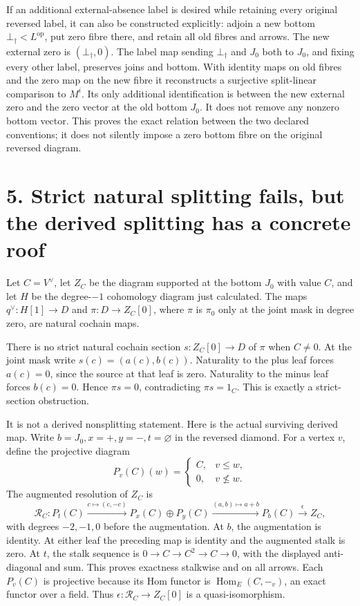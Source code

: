 \documentclass[10pt,a4paper,oneside]{report}
\begin{document}
If an additional external-absence label is desired while retaining every
original reversed label, it can also be constructed explicitly: adjoin a
new bottom \(\bot_\dagger<L^{\mathrm{op}}\), put zero fibre there, and
retain all old fibres and arrows. The new external zero is
\((\bot_\dagger,0)\). The label map sending \(\bot_\dagger\) and \(J_0\)
both to \(J_0\), and fixing every other label, preserves joins and
bottom. With identity maps on old fibres and the zero map on the new
fibre it reconstructs a surjective split-linear comparison to \(M^i\).
Its only additional identification is between the new external zero and
the zero vector at the old bottom \(J_0\). It does not remove any
nonzero bottom vector. This proves the exact relation between the two
declared conventions; it does not silently impose a zero bottom fibre on
the original reversed diagram.

\section{5. Strict natural splitting fails, but the derived splitting
has a concrete
roof}\label{proof03:strict-natural-splitting-fails-but-the-derived-splitting-has-a-concrete-roof}

Let \(C=V^\vee\), let \(Z_C\) be the diagram supported at the bottom
\(J_0\) with value \(C\), and let \(H\) be the degree-\(-1\) cohomology
diagram just calculated. The maps \(q^\vee:H[1]\to D\) and
\(\pi:D\to Z_C[0]\), where \(\pi\) is \(\pi_0\) only at the joint mask
in degree zero, are natural cochain maps.

There is no strict natural cochain section \(s:Z_C[0]\to D\) of \(\pi\)
when \(C\ne0\). At the joint mask write \(s(c)=(a(c),b(c))\). Naturality
to the plus leaf forces \(a(c)=0\), since the source at that leaf is
zero. Naturality to the minus leaf forces \(b(c)=0\). Hence \(\pi s=0\),
contradicting \(\pi s=1_C\). This is exactly a strict-section
obstruction.

It is not a derived nonsplitting statement. Here is the actual surviving
derived map. Write \(b=J_0,x=+,y=-,t=\varnothing\) in the reversed
diamond. For a vertex \(v\), define the projective diagram \[
P_v(C)(w)=\begin{cases}C,&v\le w,\\0,&v\nleq w.\end{cases}
\] The augmented resolution of \(Z_C\) is \[
\mathcal R_C:
P_t(C)\xrightarrow{c\mapsto(c,-c)}
P_x(C)\oplus P_y(C)\xrightarrow{(a,b)\mapsto a+b}
P_b(C)\xrightarrow{\epsilon}Z_C,
\] with degrees \(-2,-1,0\) before the augmentation. At \(b\), the
augmentation is identity. At either leaf the preceding map is identity
and the augmented stalk is zero. At \(t\), the stalk sequence is
\(0\to C\to C^2\to C\to0\), with the displayed anti-diagonal and sum.
This proves exactness stalkwise and on all arrows. Each \(P_v(C)\) is
projective because its Hom functor is \(\operatorname{Hom}_E(C,-_v)\),
an exact functor over a field. Thus \(\epsilon:\mathcal R_C\to Z_C[0]\)
is a quasi-isomorphism.
\end{document}
